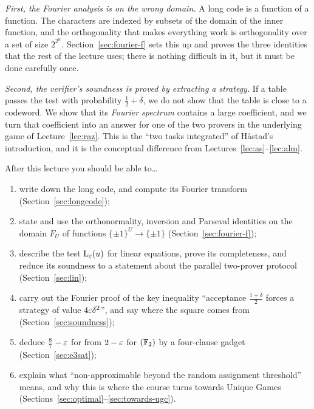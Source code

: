 \emph{First, the Fourier analysis is on the wrong domain.}  A long code is a function of a function.  The characters are indexed by subsets of the domain of the inner function, and the orthogonality that makes everything work is orthogonality over a set of size $2^{2^n}$.
Section~\ref{sec:fourier-f} sets this up and proves the three identities that the rest of the lecture uses; there is nothing difficult in it, but it must be done carefully once.

\emph{Second, the verifier's soundness is proved by \emph{extracting} a strategy.}  If a table passes the test with probability $\tfrac12+\delta$, we do not show that the table is close to a codeword.  We show that its \emph{Fourier spectrum} contains a large coefficient, and we turn that coefficient into an answer for one of the two provers in the underlying game of Lecture~\ref{lec:raz}.
This is the ``two tasks integrated'' of H\aa stad's introduction, and it is the conceptual difference from Lectures~\ref{lec:as}--\ref{lec:alm}.

\begin{goalbox}{After this lecture you should be able to\ldots}
\begin{enumerate}[leftmargin=*,label=(\arabic*)]
  \item write down the long code, and compute its Fourier transform (Section~\ref{sec:longcode});
  \item state and use the orthonormality, inversion and Parseval identities on the domain $F_U$ of functions $\{\pm1\}^U\to\{\pm1\}$ (Section~\ref{sec:fourier-f});
  \item describe the test $\mathrm{L}_\varepsilon(u)$ for linear equations, prove its completeness, and reduce its soundness to a statement about the parallel two-prover protocol (Section~\ref{sec:lin});
  \item carry out the Fourier proof of the key inequality ``acceptance $\tfrac{1+\delta}{2}$ forces a strategy of value $4\varepsilon\delta^2$'', and say where the square comes from (Section~\ref{sec:soundness});
  \item deduce $\tfrac87-\varepsilon$ for  from $2-\varepsilon$ for $(\mathbb{F}_2)$ by a four-clause gadget (Section~\ref{sec:e3sat});
  \item explain what ``non-approximable beyond the random assignment threshold'' means, and why this is where the course turns towards Unique Games (Sections~\ref{sec:optimal}--\ref{sec:towards-ugc}).
\end{enumerate}
\end{goalbox}


